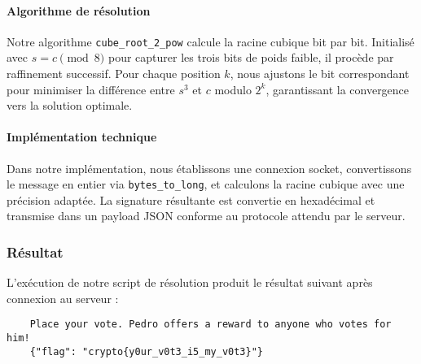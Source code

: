 \paragraph{Algorithme de résolution}
Notre algorithme \texttt{cube\_root\_2\_pow} calcule la racine cubique bit par bit. Initialisé avec $s = c \pmod{8}$ pour capturer les trois bits de poids faible, il procède par raffinement successif. Pour chaque position $k$, nous ajustons le bit correspondant pour minimiser la différence entre $s^3$ et $c$ modulo $2^k$, garantissant la convergence vers la solution optimale.


\paragraph{Implémentation technique}
Dans notre implémentation, nous établissons une connexion socket, convertissons le message en entier via \texttt{bytes\_to\_long}, et calculons la racine cubique avec une précision adaptée. La signature résultante est convertie en hexadécimal et transmise dans un payload JSON conforme au protocole attendu par le serveur.


\subsubsection{Résultat}
L’exécution de notre script de résolution produit le résultat suivant après connexion au serveur :

    \begin{verbatim}
    Place your vote. Pedro offers a reward to anyone who votes for him!
    {"flag": "crypto{y0ur_v0t3_i5_my_v0t3}"}
    \end{verbatim}
